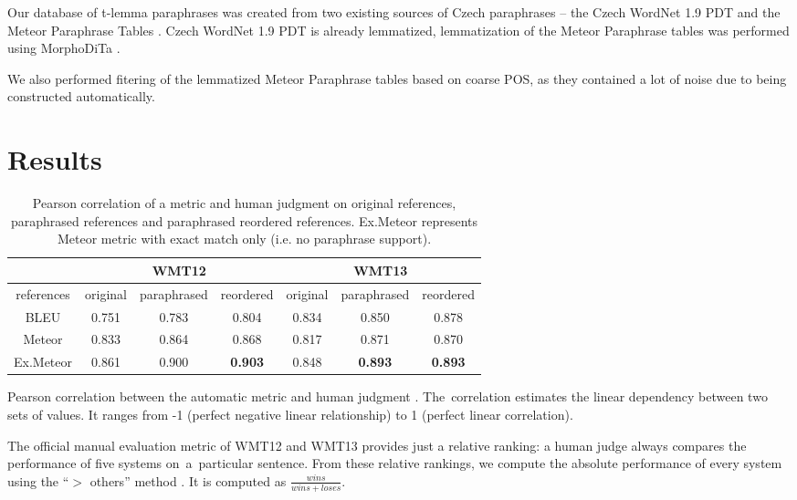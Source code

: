 Our database of t-lemma paraphrases was created from two existing sources of 
Czech paraphrases -- the Czech WordNet 1.9 PDT \cite{czech-wordnet} and the 
Meteor Paraphrase Tables \cite{meteor-tables}. Czech WordNet 1.9 PDT is already 
lemmatized, lemmatization of the Meteor Paraphrase tables was performed using 
MorphoDiTa \cite{morphodita}.

We also performed fitering of the lemmatized Meteor Paraphrase tables based on 
coarse POS, as they contained a lot of noise due to being constructed 
automatically.

\section{Results}
\begin{table}[tb]
\begin{center}


\begin{tabular}{|c|ccc|ccc|}
\hline
\multicolumn{1}{|l|}{} & \multicolumn{3}{c|}{\textbf{WMT12}}   & \multicolumn{3}{c|}{\textbf{WMT13}}  \\ 
\hline
references             & original & paraphrased & reordered & original & paraphrased & reordered \\ 
\hline
BLEU                   & 0.751    & 0.783       & 0.804     & 0.834    & 0.850       & 0.878       \\ 
Meteor                 & 0.833    & 0.864       & 0.868     & 0.817    & 0.871       & 0.870       \\ 
Ex.Meteor              & 0.861    & 0.900  & \textbf{0.903} & 0.848  & \textbf{0.893} & \textbf{0.893} \\ 
\hline
\end{tabular}
\caption{Pearson correlation of a metric and human judgment on original 
references, paraphrased references and paraphrased reordered references. 
Ex.Meteor represents Meteor metric with exact match only (i.e. no paraphrase
support).}
\label{results}
\end{center}
\end{table}

Pearson correlation between the automatic metric and human judgment \cite{bleu}. 
The~correlation estimates the linear dependency between two sets of values. 
It ranges from -1 (perfect negative linear relationship) to 1 (perfect linear 
correlation). 

The official manual evaluation metric of WMT12 and WMT13 provides just a 
relative ranking: a human judge always compares the performance of five systems 
on~a~particular sentence. From these relative rankings, we compute the absolute 
performance of every system using the  “$ > $ others” method \cite{bojar-grains}.
It is computed as $ \frac{wins}{wins+loses} $.

